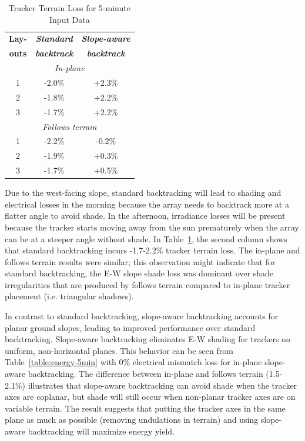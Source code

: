 \documentclass[conference]{IEEEtran}
\begin{document}
\begin{table}[htbp]
\caption{Tracker Terrain Loss for 5-minute Input Data}
\begin{center}
\begin{tabular}{|c|c|c|}
\hline
\textbf{Lay-}& \textbf{\textit{Standard}}& \textbf{\textit{Slope-aware}} \\
\textbf{outs}& \textbf{\textit{backtrack}}&    \textbf{\textit{backtrack}}\\
\hline
\multicolumn{3}{|c|}{\textit{In-plane}} \\
\hline
1& -2.0\% & +2.3\% \\
\hline
2& -1.8\% & +2.2\% \\
\hline
3& -1.7\% & +2.2\% \\
\hline
\multicolumn{3}{|c|}{\textit{Follows terrain}} \\
\hline
1& -2.2\% & -0.2\%  \\
\hline
2& -1.9\% & +0.3\%  \\
\hline
3& -1.7\% & +0.5\%  \\
\hline
\end{tabular}
\label{table:terrain-loss-5min}
\end{center}
\end{table}

Due to the west-facing slope, standard backtracking will lead to shading and electrical losses in the morning because the array needs to backtrack more at a flatter angle to avoid shade. In the afternoon, irradiance losses will be present because the tracker starts moving away from the sun prematurely when the array can be at a steeper angle without shade. In Table~\ref{table:terrain-loss-5min}, the second column shows that standard backtracking incurs -1.7-2.2\% tracker terrain loss. The in-plane and follows terrain results were similar; this observation might indicate that for standard backtracking, the E-W slope shade loss was dominant over shade irregularities that are produced by follows terrain compared to in-plane tracker placement (i.e. triangular shadows).

In contrast to standard backtracking, slope-aware backtracking accounts for planar ground slopes, leading to improved performance over standard backtracking. Slope-aware backtracking eliminates E-W shading for trackers on uniform, non-horizontal planes. This behavior can be seen from Table~\ref{table:energy-5min} with 0\% electrical mismatch loss for in-plane slope-aware backtracking. The difference between in-plane and follows terrain (1.5-2.1\%) illustrates that slope-aware backtracking can avoid shade when the tracker axes are coplanar, but shade will still occur when non-planar tracker axes are on variable terrain. The result suggests that putting the tracker axes in the same plane as much as possible (removing undulations in terrain) and using slope-aware backtracking will maximize energy yield.
\end{document}
